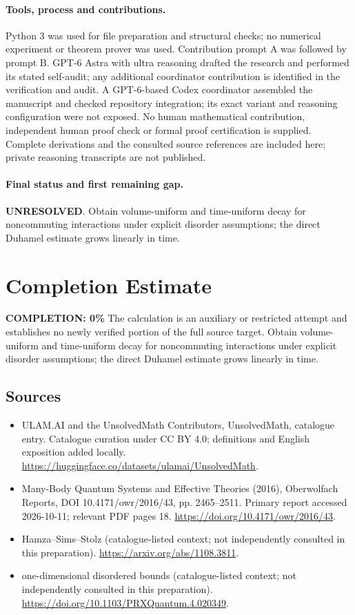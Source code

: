 \documentclass[11pt]{article}
\begin{document}
\paragraph{Tools, process and contributions.}
Python 3 was used for file preparation and structural checks; no numerical experiment or theorem prover was used. Contribution prompt A was followed by prompt B. GPT-6 Astra with ultra reasoning drafted the research and performed its stated self-audit; any additional coordinator contribution is identified in the verification and audit. A GPT-6-based Codex coordinator assembled the manuscript and checked repository integration; its exact variant and reasoning configuration were not exposed. No human mathematical contribution, independent human proof check or formal proof certification is supplied. Complete derivations and the consulted source references are included here; private reasoning transcripts are not published.

\paragraph{Final status and first remaining gap.}
\textbf{UNRESOLVED}. Obtain volume-uniform and time-uniform decay for noncommuting interactions under explicit disorder assumptions; the direct Duhamel estimate grows linearly in time.

\section{Completion Estimate}
\noindent\textbf{COMPLETION: 0\%}
The calculation is an auxiliary or restricted attempt and establishes no newly verified portion of the full source target. Obtain volume-uniform and time-uniform decay for noncommuting interactions under explicit disorder assumptions; the direct Duhamel estimate grows linearly in time.

\subsection{Sources}
\begin{itemize}
\item[\hypertarget{source:statement:1}{S1}] ULAM.AI and the UnsolvedMath Contributors, UnsolvedMath, catalogue entry. Catalogue curation under CC BY 4.0; definitions and English exposition added locally.
\url{https://huggingface.co/datasets/ulamai/UnsolvedMath}.
\item[\hypertarget{source:statement:2}{S2}] Many-Body Quantum Systems and Effective Theories (2016), Oberwolfach Reports, DOI 10.4171/owr/2016/43, pp. 2465--2511. Primary report accessed 2026-10-11; relevant PDF pages 18.
\url{https://doi.org/10.4171/owr/2016/43}.
\item[\hypertarget{source:statement:3}{S3}] Hamza--Sims--Stolz (catalogue-listed context; not independently consulted in this preparation).
\url{https://arxiv.org/abs/1108.3811}.
\item[\hypertarget{source:statement:4}{S4}] one-dimensional disordered bounds (catalogue-listed context; not independently consulted in this preparation).
\url{https://doi.org/10.1103/PRXQuantum.4.020349}.
\end{itemize}
\label{end:statement}
\end{document}

